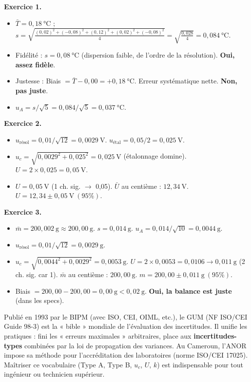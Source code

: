 \documentclass[11pt]{article}
\begin{document}
\begin{corrige}
\textbf{Exercice 1.}
\begin{itemize}
\item[a)] $\bar{T} = 0,18\ \mathrm{°C}$ ; $s = \sqrt{\frac{(0,02)^2+(-0,08)^2+(0,12)^2+(0,02)^2+(-0,08)^2}{4}} = \sqrt{\frac{0,028}{4}} = 0,084\ \mathrm{°C}$.
\item[b)] Fidélité : $s = 0,08\ \mathrm{°C}$ (dispersion faible, de l'ordre de la résolution). \textbf{Oui, assez fidèle}.
\item[c)] Justesse : Biais $= \bar{T} - 0,00 = +0,18\ \mathrm{°C}$. Erreur systématique nette. \textbf{Non, pas juste}.
\item[d)] $u_A = s/\sqrt{5} = 0,084/\sqrt{5} = 0,037\ \mathrm{°C}$.
\end{itemize}
\textbf{Exercice 2.}
\begin{itemize}
\item[a)] $u_{\text{résol}} = 0,01/\sqrt{12} = 0,0029\ \mathrm{V}$. $u_{\text{étal}} = 0,05/2 = 0,025\ \mathrm{V}$.
\item[b)] $u_c = \sqrt{0,0029^2 + 0,025^2} = 0,025\ \mathrm{V}$ (étalonnage domine). $U = 2 \times 0,025 = 0,05\ \mathrm{V}$.
\item[c)] $U=0,05\ \mathrm{V}$ (1 ch. sig. $\to$ 0,05). $\bar{U}$ au centième : $12,34\ \mathrm{V}$. $\boxed{U = 12,34 \pm 0,05\ \mathrm{V}\ (95\%)}$.
\end{itemize}
\textbf{Exercice 3.}
\begin{itemize}
\item[a)] $\bar{m} = 200,002\ \mathrm{g} \approx 200,00\ \mathrm{g}$. $s = 0,014\ \mathrm{g}$. $u_A = 0,014/\sqrt{10} = 0,0044\ \mathrm{g}$.
\item[b)] $u_{\text{résol}} = 0,01/\sqrt{12} = 0,0029\ \mathrm{g}$.
\item[c)] $u_c = \sqrt{0,0044^2 + 0,0029^2} = 0,0053\ \mathrm{g}$. $U = 2 \times 0,0053 = 0,0106 \to 0,011\ \mathrm{g}$ (2 ch. sig. car 1). $\bar{m}$ au centième : $200,00\ \mathrm{g}$. $\boxed{m = 200,00 \pm 0,011\ \mathrm{g}\ (95\%)}$.
\item[d)] Biais $= 200,00 - 200,00 = 0,00\ \mathrm{g} < 0,02\ \mathrm{g}$. \textbf{Oui, la balance est juste} (dans les specs).
\end{itemize}
\end{corrige}

\begin{savaistu}
Publié en 1993 par le BIPM (avec ISO, CEI, OIML, etc.), le GUM (NF ISO/CEI Guide 98-3) est la « bible » mondiale de l'évaluation des incertitudes. Il unifie les pratiques : fini les « erreurs maximales » arbitraires, place aux \textbf{incertitudes-types} combinées par la loi de propagation des variances. Au Cameroun, l'ANOR impose sa méthode pour l'accréditation des laboratoires (norme ISO/CEI 17025). Maîtriser ce vocabulaire (Type A, Type B, $u_c$, $U$, $k$) est indispensable pour tout ingénieur ou technicien supérieur.
\end{savaistu}
\end{document}
